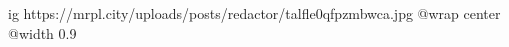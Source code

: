  
 
 
 
 

\ifcmt
  ig https://mrpl.city/uploads/posts/redactor/talfle0qfpzmbwca.jpg
  @wrap center
  @width 0.9
\fi
